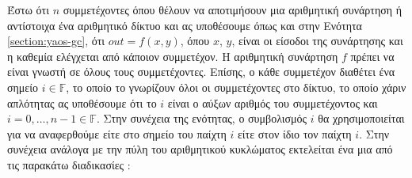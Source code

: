 Έστω ότι $n$ συμμετέχοντες όπου θέλουν να αποτιμήσουν μια αριθμητική συνάρτηση ή αντίστοιχα ένα αριθμητικό δίκτυο και ας υποθέσουμε όπως και στην Ενότητα \ref{section:yaos-gc}, ότι $out = f(x, y)$, όπου $x$, $y$, είναι οι είσοδοι της συνάρτησης και η καθεμία ελέγχεται από κάποιον συμμετέχον. Η αριθμητική συνάρτηση $f$ πρέπει να είναι γνωστή σε όλους τους συμμετέχοντες. Επίσης, ο κάθε συμμετέχον διαθέτει ένα σημείο $i \in \mathbb{F}$, το οποίο το γνωρίζουν όλοι οι συμμετέχοντες στο δίκτυο, το οποίο χάριν απλότητας ας υποθέσουμε ότι το $i$ είναι ο αύξων αριθμός του συμμετέχοντος και $i = 0, \ldots, n-1 \in \mathbb{F}$. Στην συνέχεια της ενότητας, ο συμβολισμός $i$ θα χρησιμοποιείται για να αναφερθούμε είτε στο σημείο του παίχτη $i$ είτε στον ίδιο τον παίχτη $i$. Στην συνέχεια ανάλογα με την πύλη του αριθμητικού κυκλώματος εκτελείται ένα μια από τις παρακάτω διαδικασίες :

